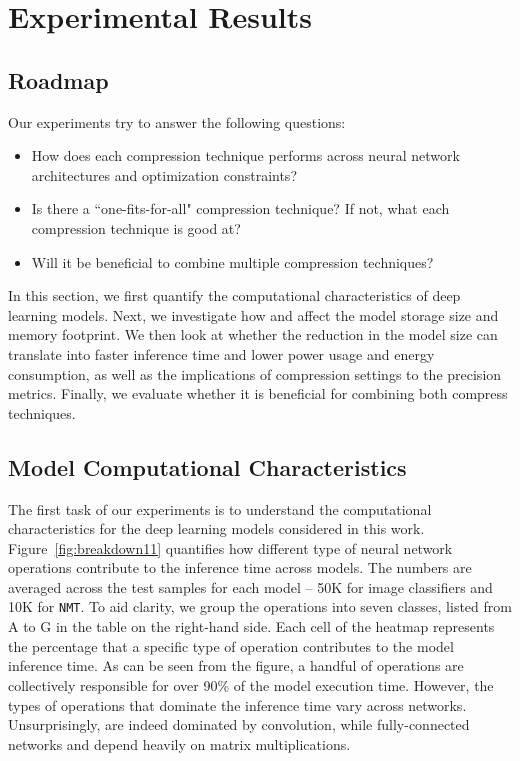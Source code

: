 \section{Experimental Results}


\subsection{Roadmap}
Our experiments try to answer the following questions:

\begin{itemize}
\item How does each compression technique performs across neural network architectures and optimization constraints?
\item Is there a ``one-fits-for-all" compression technique? If not, what each compression technique is good at?
\item Will it be beneficial to combine multiple compression techniques?
\end{itemize}

In this section, we first quantify the computational characteristics of deep learning models. Next, we investigate how \quantization and
\pruning affect the model storage size and memory footprint. We then look at whether the reduction in the model size can translate into
faster inference time and lower power usage and energy consumption, as well as the implications of compression settings to the precision
metrics. Finally, we evaluate whether it is beneficial for combining both compress techniques.
\subsection{Model Computational Characteristics}
The first task of our experiments is to understand the computational characteristics for the deep learning models considered in this work.
Figure~\ref{fig:breakdown11} quantifies how different type of neural network operations contribute to the inference time across models. The
numbers are averaged across the test samples for each model -- 50K for image classifiers and 10K for \texttt{NMT}. To aid clarity, we group
the operations into seven classes, listed from A to G in the table on the right-hand side. Each cell of the heatmap represents the
percentage that a specific type of operation contributes to the model inference time. As can be seen from the figure, a handful of
operations are collectively responsible for over 90\% of the model execution time. However, the types of operations that dominate the
inference time vary across networks. Unsurprisingly, \CNNs are indeed dominated by convolution, while fully-connected networks and \RNNs
depend heavily on matrix multiplications.

